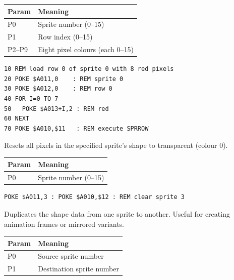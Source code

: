 \begin{center}
\small
\begin{tabular}{@{}ll@{}}
\toprule
\textbf{Param} & \textbf{Meaning} \\
\midrule
P0     & Sprite number (0--15) \\
P1     & Row index (0--15) \\
P2--P9 & Eight pixel colours (each 0--15) \\
\bottomrule
\end{tabular}
\end{center}

\begin{lstlisting}
10 REM load row 0 of sprite 0 with 8 red pixels
20 POKE $A011,0    : REM sprite 0
30 POKE $A012,0    : REM row 0
40 FOR I=0 TO 7
50   POKE $A013+I,2 : REM red
60 NEXT
70 POKE $A010,$11   : REM execute SPRROW
\end{lstlisting}



Resets all pixels in the specified sprite's shape to transparent (colour 0).

\begin{center}
\small
\begin{tabular}{@{}ll@{}}
\toprule
\textbf{Param} & \textbf{Meaning} \\
\midrule
P0 & Sprite number (0--15) \\
\bottomrule
\end{tabular}
\end{center}

\begin{lstlisting}
POKE $A011,3 : POKE $A010,$12 : REM clear sprite 3
\end{lstlisting}



Duplicates the shape data from one sprite to another.  Useful for creating
animation frames or mirrored variants.

\begin{center}
\small
\begin{tabular}{@{}ll@{}}
\toprule
\textbf{Param} & \textbf{Meaning} \\
\midrule
P0 & Source sprite number \\
P1 & Destination sprite number \\
\bottomrule
\end{tabular}
\end{center}

